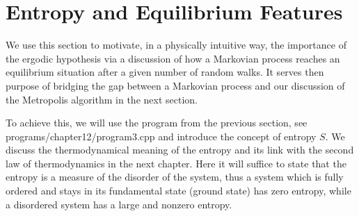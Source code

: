\section{Entropy and Equilibrium Features}
We use this section to motivate, in a physically intuitive way, the importance of the ergodic hypothesis via 
a discussion of how a Markovian process reaches an equilibrium situation after a given number of random walks. 
It serves then purpose of bridging the gap between a Markovian process and our discussion of the Metropolis 
algorithm in the next section. 

To achieve this, we will use the program from the previous section, see programs/chapter12/program3.cpp 
and introduce
the concept of entropy $S$. We discuss the thermodynamical meaning of the entropy and its 
link with the second law of thermodynamics in the next chapter. 
Here it will suffice to state that the entropy is a measure of the disorder of the system, thus a system which is fully 
ordered and stays in its fundamental state (ground state) has zero entropy, while a disordered system has a large and
nonzero entropy.

